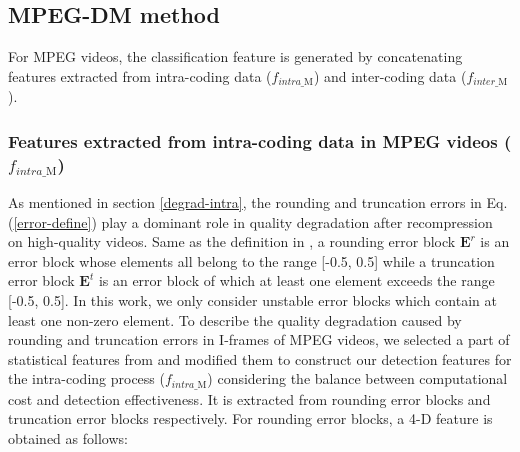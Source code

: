 \documentclass[journal,sort]{IEEEtran}
\begin{document}
\subsection{MPEG-DM method}
For MPEG videos, the classification feature is generated by concatenating features extracted from intra-coding data ($f_{intra\_\text{M}}$) and inter-coding data ($f_{inter\_\text{M}}$).


\subsubsection{Features extracted from intra-coding data in MPEG videos ($f_{intra\_\text{M}}$)}
As mentioned in section \ref{degrad-intra}, the rounding and truncation errors in Eq. (\ref{error-define}) play a dominant role in quality degradation after recompression on high-quality videos. Same as the definition in \cite{yang2014effective}, a rounding error block $\mathbf{E}^r$ is an error block whose elements all belong to the range [-0.5, 0.5] while a truncation error block $\mathbf{E}^t$ is an error block of which at least one element exceeds the range [-0.5, 0.5]. In this work, we only consider unstable error blocks which contain at least one non-zero element. To describe the quality degradation caused by rounding and truncation errors in I-frames of MPEG videos, we selected a part of statistical features from \cite{yang2014effective} and modified them to construct our detection features for the intra-coding process ($f_{intra\_\text{M}}$) considering the balance between computational cost and detection effectiveness. It is extracted from rounding error blocks and truncation error blocks respectively. For rounding error blocks, a 4-D feature is obtained as follows: 
\end{document}
